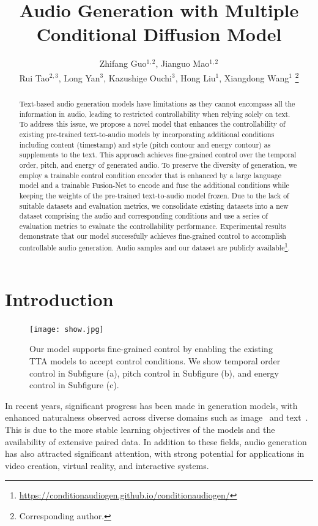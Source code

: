 \documentclass[letterpaper]{article}
\title{Audio Generation with Multiple Conditional Diffusion Model}
\author {
    Zhifang Guo$^{1,2}$,
    Jianguo Mao$^{1,2}$ \\
    Rui Tao$^{2,3}$,
    Long Yan$^{3}$,
    Kazushige Ouchi$^{3}$,
    Hong Liu$^{1}$,
    Xiangdong Wang$^{1}$
    \thanks{Corresponding author.}
}
\begin{document}
\maketitle

\begin{abstract}

Text-based audio generation models have limitations as they cannot encompass all the information in audio, leading to restricted controllability when relying solely on text. To address this issue, we propose a novel model that enhances the controllability of existing pre-trained text-to-audio models by incorporating additional conditions including content (timestamp) and style (pitch contour and energy contour) as supplements to the text. This approach achieves fine-grained control over the temporal order, pitch, and energy of generated audio. To preserve the diversity of generation, we employ a trainable control condition encoder that is enhanced by a large language model and a trainable Fusion-Net to encode and fuse the additional conditions while keeping the weights of the pre-trained text-to-audio model frozen. Due to the lack of suitable datasets and evaluation metrics, we consolidate existing datasets into a new dataset comprising the audio and corresponding conditions and use a series of evaluation metrics to evaluate the controllability performance. Experimental results demonstrate that our model successfully achieves fine-grained control to accomplish controllable audio generation. Audio samples and our dataset are publicly available\footnote{\url{https://conditionaudiogen.github.io/conditionaudiogen/}}.

\end{abstract}

\section{Introduction}

\begin{figure}[!t]
    \centering
    \texttt{[image: show.jpg]}
    \caption{Our model supports fine-grained control by enabling the existing TTA models to accept control conditions. We show temporal order control in Subfigure (a), pitch control in Subfigure (b), and energy control in Subfigure (c).}
    \label{show}
\end{figure}

In recent years, significant progress has been made in generation models, with enhanced naturalness observed across diverse domains such as image~\cite{ramesh2022dalle2,chen2020igpt,nichol2022glide} and text~\cite{radford2020gpt3,schick2023peer,kong2020panns}. This is due to the more stable learning objectives of the models and the availability of extensive paired data. In addition to these fields, audio generation has also attracted significant attention, with strong potential for applications in video creation, virtual reality, and interactive systems.
\end{document}

